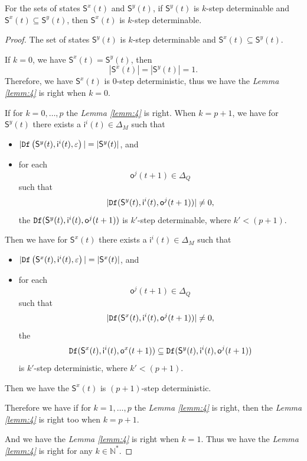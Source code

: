 \begin{lemma}
For the sets of states $\mathsf{S}^{x}(t)$ and $\mathsf{S}^{y}(t)$, if $\mathsf{S}^{y}(t)$ is $k$-step determinable and $\mathsf{S}^{x}(t)\subseteq \mathsf{S}^{y}(t)$, then $\mathsf{S}^{x}(t)$ is $k$-step determinable.
  \label{lemm:4}
\end{lemma}
\begin{proof}
The set of states $\mathsf{S}^{y}(t)$ is $k$-step determinable and $\mathsf{S}^{x}(t)\subseteq \mathsf{S}^{y}(t)$. %

If $k=0$, we have $\mathsf{S}^{x}(t) = \mathsf{S}^{y}(t)$, then \[|\mathsf{S}^{x}(t)|=|\mathsf{S}^{y}(t)|=1.\] Therefore, we have $\mathsf{S}^{x}(t)$ is $0$-step deterministic, thus we have the {\em Lemma \ref{lemm:4}} is right when $k=0$.


 
 If for $k=0,\ldots, p$ the {\em Lemma \ref{lemm:4}} is right. When $k=p+1$, we have for $\mathsf{S}^{y}(t)$ there exists a $\mathsf{i}^{i}(t)\in \Delta_M$ such that
 \begin{itemize}
 \item  $|{\tt Df}\left(\mathsf{S}^{y}(t),\mathsf{i}^{i}(t),\varepsilon\right)|=|\mathsf{S}^{y}(t)|$, and 
 \item  for each \[\mathsf{o}^{j}(t+1)\in \Delta_Q\] such that \[|{\tt Df}(\mathsf{S}^{y}(t),\mathsf{i}^{i}(t),\mathsf{o}^{j}(t+1))|\neq 0,\] the ${\tt Df}(\mathsf{S}^{y}(t),\mathsf{i}^{i}(t),\mathsf{o}^{j}(t+1))$ is $k'$-step determinable, where ${k'}<(p+1)$.
 \end{itemize}
 Then we have for $\mathsf{S}^{x}(t)$ there exists a $\mathsf{i}^{i}(t)\in \Delta_M$ such that
 \begin{itemize}
 \item  $|{\tt Df}\left(\mathsf{S}^{x}(t),\mathsf{i}^{i}(t),\varepsilon\right)|=|\mathsf{S}^{x}(t)|$, and 
 \item  for each \[\mathsf{o}^{j}(t+1)\in \Delta_Q\] such that \[|{\tt Df}(\mathsf{S}^{x}(t),\mathsf{i}^{i}(t),\mathsf{o}^{j}(t+1))|\neq 0,\] the \[{\tt Df}(\mathsf{S}^{x}(t),\mathsf{i}^{i}(t),\mathsf{o}^{x}(t+1))\subseteq {\tt Df}(\mathsf{S}^{y}(t),\mathsf{i}^{i}(t),\mathsf{o}^{j}(t+1))\] is  $k'$-step deterministic, where ${k'}<(p+1)$.
 \end{itemize}  Then we have the $\mathsf{S}^{x}(t)$ is $(p+1)$-step deterministic. 
 
 Therefore we have if for $k=1,\ldots, p$ the {\em Lemma \ref{lemm:4}} is right, then the {\em Lemma \ref{lemm:4}} is right too when $k=p+1$. 

And we have the {\em Lemma \ref{lemm:4}} is right when $k=1$. Thus we have the {\em Lemma \ref{lemm:4}} is right for any $k\in \mathbb{N}^*$.
 
\end{proof}

